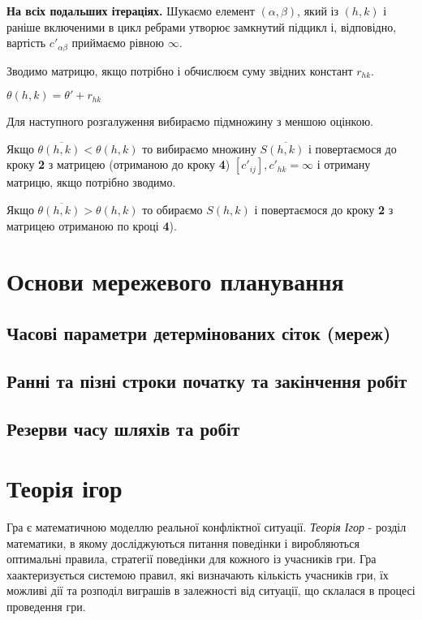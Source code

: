 \documentclass[12pt,a4paper]{book}
\newenvironment{slim_enumerate}{
\begin{enumerate}
  \setlength{\itemsep}{1pt}
  \setlength{\parskip}{0pt}
  \setlength{\parsep}{0pt}}
{\end{enumerate}}
\begin{document}
\begin{slim_enumerate}
\begin{slim_enumerate}
\begin{slim_enumerate}
{\bf На всіх подальших ітераціях.} Шукаємо елемент $(\alpha, \beta)$, який із $(h,k)$ і раніше включеними в цикл ребрами утворює замкнутий підцикл і, відповідно, вартість $c'_{\alpha \beta}$ приймаємо рівною $\infty$.

      \item Зводимо матрицю, якщо потрібно і обчислюєм суму звідних констант $r_{h k}$.
      \item $ \theta(h,k) = \theta' + r_{h k} $
    \end{slim_enumerate}
  \end{slim_enumerate}
  \item Для наступного розгалуження вибираємо підмножину з меншою оцінкою.
  \begin{slim_enumerate}
    \item Якщо $\theta\overline{(h,k)} < \theta(h,k)$ то вибираємо множину $S\overline{(h,k)}$ і повертаємося до кроку {\bf 2} з матрицею (отриманою до кроку {\bf 4}) $[c'_{ij}], c'_{h k}=\infty$ і отриману матрицю, якщо потрібно зводимо.
    \item Якщо $\theta\overline{(h,k)} > \theta(h,k)$ то обираємо $S(h,k)$ і повертаємося до кроку {\bf 2} з матрицею отриманою по кроці {\bf 4}).
  \end{slim_enumerate}
\end{slim_enumerate}

\chapter{Основи мережевого планування}
\section{Часові параметри детермінованих сіток (мереж)}
\section{Ранні та пізні строки початку та закінчення робіт}
\section{Резерви часу шляхів та робіт}
\chapter{Теорія ігор}
Гра є математичною моделлю реальної конфліктної ситуації. \emph{Теорія Ігор} - розділ математики, в якому досліджуються питання поведінки і виробляються оптимальні правила, стратегії поведінки для кожного із учасників гри. Гра хаактеризується системою правил, які визначають кількість учасників гри, їх можливі дії та розподіл виграшів в залежності від ситуації, що склалася в процесі проведення гри.
\end{document}

